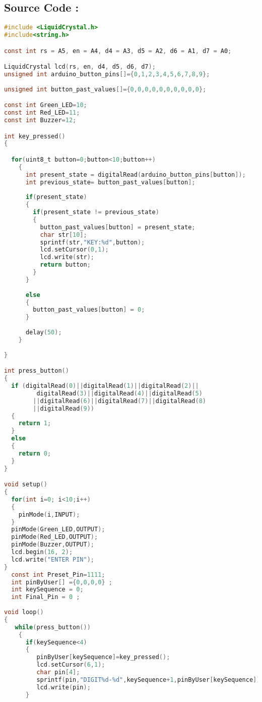\documentclass[12pt]{article}
\begin{document}
 \subsection*{\textbf{Source Code :}}
 \begin{lstlisting}[language=C] 
#include <LiquidCrystal.h>
#include<string.h>

const int rs = A5, en = A4, d4 = A3, d5 = A2, d6 = A1, d7 = A0; 

LiquidCrystal lcd(rs, en, d4, d5, d6, d7);
unsigned int arduino_button_pins[]={0,1,2,3,4,5,6,7,8,9};
 
unsigned int button_past_values[]={0,0,0,0,0,0,0,0,0,0};

const int Green_LED=10;
const int Red_LED=11;
const int Buzzer=12;

int key_pressed() 
{

  for(uint8_t button=0;button<10;button++)
    {
      int present_state = digitalRead(arduino_button_pins[button]); 
      int previous_state= button_past_values[button];
      
      if(present_state)
      {
        if(present_state != previous_state) 
        {
          button_past_values[button] = present_state;
          char str[10];
          sprintf(str,"KEY:%d",button);
          lcd.setCursor(0,1);
          lcd.write(str);        
          return button; 
        }
      }
          
      else 
      {
        button_past_values[button] = 0; 
      } 
      
      delay(50);     
    }    
  
}

int press_button()
{
  if (digitalRead(0)||digitalRead(1)||digitalRead(2)||
         digitalRead(3)||digitalRead(4)||digitalRead(5)
        ||digitalRead(6)||digitalRead(7)||digitalRead(8)
        ||digitalRead(9)) 
  { 
    return 1; 
  }
  else
  { 
    return 0; 
  }
}

void setup()
{
  for(int i=0; i<10;i++)
  {
    pinMode(i,INPUT);
  }  
  pinMode(Green_LED,OUTPUT); 
  pinMode(Red_LED,OUTPUT);
  pinMode(Buzzer,OUTPUT); 
  lcd.begin(16, 2); 
  lcd.write("ENTER PIN"); 
}
  const int Preset_Pin=1111; 
  int pinByUser[] ={0,0,0,0} ;
  int keySequence = 0;
  int Final_Pin = 0 ;
  
void loop() 
{ 
   while(press_button()) 
    {
      if(keySequence<4)  
      {
         pinByUser[keySequence]=key_pressed();
         lcd.setCursor(6,1);
         char pin[4];
         sprintf(pin,"DIGIT%d-%d",keySequence+1,pinByUser[keySequence]); 
         lcd.write(pin);
      }


\end{lstlisting}
\end{document}
